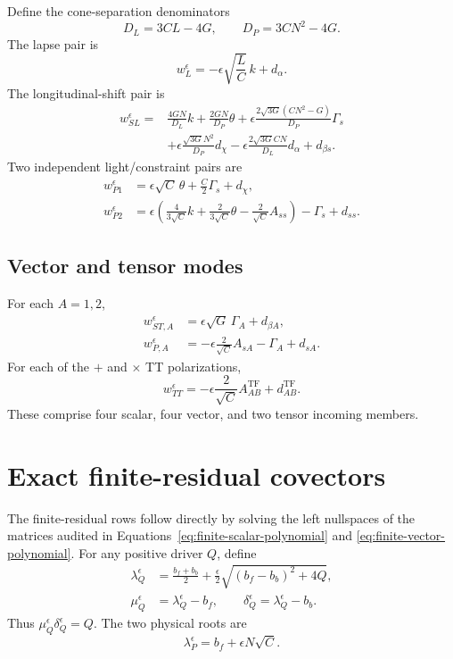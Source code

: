 \documentclass[11pt]{article}
\newcommand{\tf}{\mathrm{TF}}
\begin{document}
Define the cone-separation denominators
\[
 D_L=3CL-4G,\qquad D_P=3CN^2-4G.
\]
The lapse pair is
\[
 w_L^\epsilon=-\epsilon\sqrt{\frac LC}\,k+d_\alpha.
\]
The longitudinal-shift pair is
\begin{align}
 w_{SL}^{\epsilon}
 ={}&\frac{4GN}{D_L}k+\frac{2GN}{D_P}\theta
 +\epsilon\frac{2\sqrt{3G}(CN^2-G)}{D_P}\Gamma_s\\
 &+\epsilon\frac{\sqrt{3G}N^2}{D_P}d_\chi
 -\epsilon\frac{2\sqrt{3G}CN}{D_L}d_\alpha
 +d_{\beta s}.
\end{align}
Two independent light/constraint pairs are
\begin{align}
 w_{P1}^{\epsilon}
   &=\epsilon\sqrt C\,\theta+\frac C2\Gamma_s+d_\chi,\\
 w_{P2}^{\epsilon}
   &=\epsilon\left(
       \frac{4}{3\sqrt C}k+\frac{2}{3\sqrt C}\theta
       -\frac{2}{\sqrt C}A_{ss}\right)-\Gamma_s+d_{ss}.
\end{align}
\subsection{Vector and tensor modes}

For each \(A=1,2\),
\begin{align}
 w_{ST,A}^{\epsilon}
   &=\epsilon\sqrt G\,\Gamma_A+d_{\beta A},\\
 w_{P,A}^{\epsilon}
   &=-\epsilon\frac{2}{\sqrt C}A_{sA}-\Gamma_A+d_{sA}.
\end{align}
For each of the \(+\) and \(\times\) TT polarizations,
\[
 w_{TT}^{\epsilon}
   =-\epsilon\frac{2}{\sqrt C}A_{AB}^{\tf}+d_{AB}^{\tf}.
\]
These comprise four scalar, four vector, and two tensor incoming members.

\section{Exact finite-residual covectors}
\label{sec:finite-rows}

The finite-residual rows follow directly by solving the left nullspaces of
the matrices audited in
Equations~\eqref{eq:finite-scalar-polynomial} and
\eqref{eq:finite-vector-polynomial}.  For any positive driver \(Q\), define
\begin{align}
 \lambda_Q^\epsilon
 &=\frac{b_f+b_b}{2}
   +\frac{\epsilon}{2}\sqrt{(b_f-b_b)^2+4Q},\\
 \mu_Q^\epsilon&=\lambda_Q^\epsilon-b_f,\qquad
 \delta_Q^\epsilon=\lambda_Q^\epsilon-b_b.
\end{align}
Thus \(\mu_Q^\epsilon\delta_Q^\epsilon=Q\).  The two physical roots are
\[
 \lambda_P^\epsilon=b_f+\epsilon N\sqrt C.
\]
\end{document}
